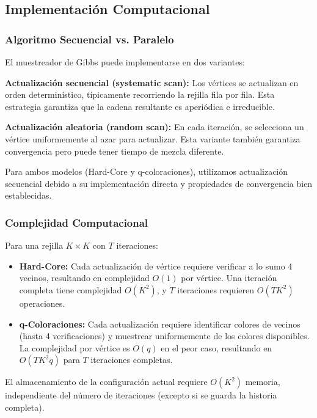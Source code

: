 \subsection{Implementación Computacional}

\subsubsection{Algoritmo Secuencial vs. Paralelo}

El muestreador de Gibbs puede implementarse en dos variantes:

\textbf{Actualización secuencial (systematic scan):} Los vértices se actualizan en orden determinístico, típicamente recorriendo la rejilla fila por fila. Esta estrategia garantiza que la cadena resultante es aperiódica e irreducible.

\textbf{Actualización aleatoria (random scan):} En cada iteración, se selecciona un vértice uniformemente al azar para actualizar. Esta variante también garantiza convergencia pero puede tener tiempo de mezcla diferente.

Para ambos modelos (Hard-Core y q-coloraciones), utilizamos actualización secuencial debido a su implementación directa y propiedades de convergencia bien establecidas.

\subsubsection{Complejidad Computacional}

Para una rejilla $K \times K$ con $T$ iteraciones:

\begin{itemize}
\item \textbf{Hard-Core:} Cada actualización de vértice requiere verificar a lo sumo 4 vecinos, resultando en complejidad $O(1)$ por vértice. Una iteración completa tiene complejidad $O(K^2)$, y $T$ iteraciones requieren $O(TK^2)$ operaciones.

\item \textbf{q-Coloraciones:} Cada actualización requiere identificar colores de vecinos (hasta 4 verificaciones) y muestrear uniformemente de los colores disponibles. La complejidad por vértice es $O(q)$ en el peor caso, resultando en $O(TK^2 q)$ para $T$ iteraciones completas.
\end{itemize}

El almacenamiento de la configuración actual requiere $O(K^2)$ memoria, independiente del número de iteraciones (excepto si se guarda la historia completa).
